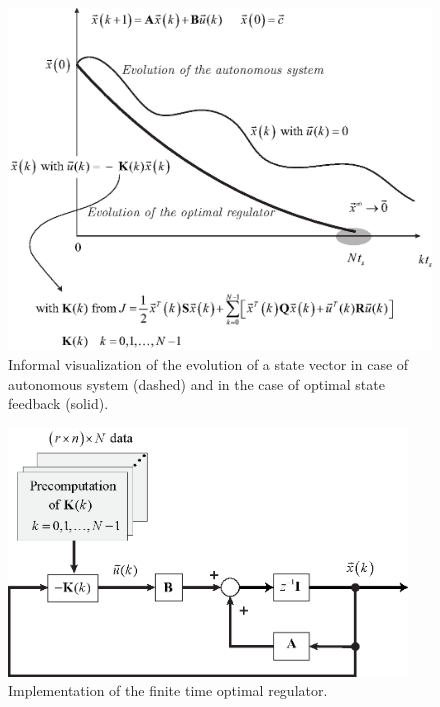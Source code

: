 \documentclass[11pt,a4paper,oneside]{book}
\numberwithin{equation}{section}
\theoremstyle{it}
\theoremstyle{definition}
\begin{document}
\begin{figure}[H]
	\centering
	\includegraphics[width = 325pt, 
	keepaspectratio]{figures/optimal_control/optimal_ctrl_reason_2.eps}
	\captionsetup{width=0.75\textwidth}
	\caption{Informal visualization of the evolution of a state vector in case 
		of autonomous system (dashed) and in the case of optimal state feedback 
		(solid).}
	\label{figure_reasons}
\end{figure}

\begin{figure}[H]
	\centering
	\includegraphics[width = 300pt, 
	keepaspectratio]{figures/optimal_control/optimal_ctrl_loop.eps}
	\captionsetup{width=0.75\textwidth}
	\caption{Implementation of the finite time optimal regulator.}
	\label{figure_loop}
\end{figure}
\end{document}

